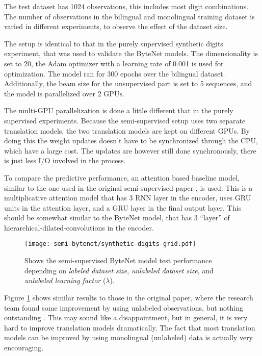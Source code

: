 The test dataset has 1024 observations, this includes most digit combinations. The number of observations in the bilingual and monolingual training dataset is varied in different experiments, to observe the effect of the dataset size.

The setup is identical to that in the purely supervised synthetic digits experiment, that was used to validate the ByteNet models. The dimensionality is set to 20, the Adam optimizer with a learning rate of 0.001 is used for optimization. The model ran for 300 epochs over the bilingual dataset. Additionally, the beam size for the unsupervised part is set to 5 sequences, and the model is parallelized over 2 GPUs.

The multi-GPU parallelization is done a little different that in the purely supervised experiments. Because the semi-supervised setup uses two separate translation models, the two translation models are kept on different GPUs. By doing this the weight updates doesn't have to be synchronized through the CPU, which have a large cost. The updates are however still done synchronously, there is just less I/O involved in the process.

To compare the predictive performance, an attention based baseline model, similar to the one used in the original semi-supervised paper \cite{semi-supervised}, is used. This is a multiplicative attention model \cite{multiplicative-attention} that has 3 RNN layer in the encoder, uses GRU units in the attention layer, and a GRU layer in the final output layer. This should be somewhat similar to the ByteNet model, that has 3 ``layer'' of hierarchical-dilated-convolutions in the encoder.

\begin{figure}[h]
    \centering
    \texttt{[image: semi-bytenet/synthetic-digits-grid.pdf]}
    \caption{Shows the semi-supervised ByteNet model test performance depending on \textit{labeled dataset size}, \textit{unlabeled dataset size}, and \textit{unlabeled learning factor} ($\lambda$).}
     \label{fig:result:semi-bytenet:missrate}
\end{figure}

Figure \ref{fig:result:semi-bytenet:missrate} shows similar results to those in the original paper, where the research team found some improvement by using unlabeled observations, but nothing outstanding \cite{semi-supervised}. This may sound like a disappointment, but in general, it is very hard to improve translation models dramatically. The fact that most translation models can be improved by using monolingual (unlabeled) data is actually very encouraging.

